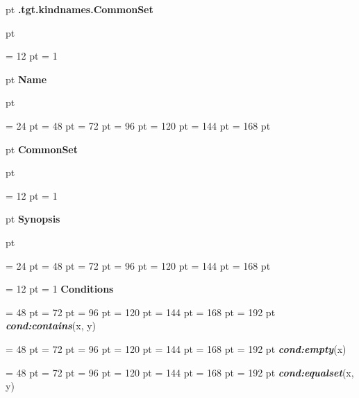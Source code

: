 {\par \pagebreak[3]  pt \noindent
{\LARGE {\bf .tgt.kindnames.CommonSet\/}}\par {} pt
} \noindent
{\par \noindent
{\par \pagebreak[3.300000] \noindent \hangindent = 12 pt \hangafter = 1 
{\par \pagebreak[3]  pt \noindent
{\Large {\bf Name\/}}\par {} pt
} \noindent
\par}
{\par \noindent  \leftskip = 24 pt  \leftmargini = 48 pt  \leftmarginii = 72 pt  \leftmarginiii = 96 pt  \leftmarginiv = 120 pt  \leftmarginv = 144 pt  \leftmarginvi = 168 pt {\par \pagebreak[3]  pt \noindent
{\Large {\bf CommonSet\/}}\par {} pt
} \noindent
\par}
{\par \pagebreak[3.300000] \noindent \hangindent = 12 pt \hangafter = 1 
{\par \pagebreak[3]  pt \noindent
{\Large {\bf Synopsis\/}}\par {} pt
} \noindent
\par}
{\par \noindent  \leftskip = 24 pt  \leftmargini = 48 pt  \leftmarginii = 72 pt  \leftmarginiii = 96 pt  \leftmarginiv = 120 pt  \leftmarginv = 144 pt  \leftmarginvi = 168 pt {\par \noindent
{\par \pagebreak[3.200000] \noindent \hangindent = 12 pt \hangafter = 1 
{\bf {\large {\bf Conditions\/}}\/}\par}
{\par \noindent  \leftskip = 48 pt  \leftmargini = 72 pt  \leftmarginii = 96 pt  \leftmarginiii = 120 pt  \leftmarginiv = 144 pt  \leftmarginv = 168 pt  \leftmarginvi = 192 pt  {\em {\bf {\large {\bf cond:contains\/}}\/}\/}(x, y)\par}
{\par \noindent  \leftskip = 48 pt  \leftmargini = 72 pt  \leftmarginii = 96 pt  \leftmarginiii = 120 pt  \leftmarginiv = 144 pt  \leftmarginv = 168 pt  \leftmarginvi = 192 pt  {\em {\bf {\large {\bf cond:empty\/}}\/}\/}(x)\par}
{\par \noindent  \leftskip = 48 pt  \leftmargini = 72 pt  \leftmarginii = 96 pt  \leftmarginiii = 120 pt  \leftmarginiv = 144 pt  \leftmarginv = 168 pt  \leftmarginvi = 192 pt  {\em {\bf {\large {\bf cond:equalset\/}}\/}\/}(x, y)\par}
}}}
